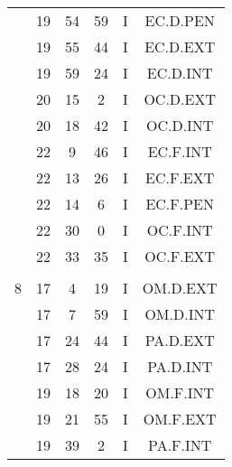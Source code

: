 \documentclass[12pt, a4paper]{article}
\begin{document}
\begin{multicols}{3}
{\begin{tabular}{c c c c c c}
	 	 	 	 & 19 & 54 & 59 & I & EC.D.PEN\\%
	 	 	 	 & 19 & 55 & 44 & I & EC.D.EXT\\%
	 	 	 	 & 19 & 59 & 24 & I & EC.D.INT\\%
	 	 	 	 & 20 & 15 & 2 & I & OC.D.EXT\\%
	 	 	 	 & 20 & 18 & 42 & I & OC.D.INT\\%
	 	 	 	 & 22 & 9 & 46 & I & EC.F.INT\\%
	 	 	 	 & 22 & 13 & 26 & I & EC.F.EXT\\%
	 	 	 	 & 22 & 14 & 6 & I & EC.F.PEN\\%
	 	 	 	 & 22 & 30 & 0 & I & OC.F.INT\\%
	 	 	 	 & 22 & 33 & 35 & I & OC.F.EXT\\%
	 	 	 	 & & & & & \\%
	 	 	 	8 & 17 & 4 & 19 & I & OM.D.EXT\\%
	 	 	 	 & 17 & 7 & 59 & I & OM.D.INT\\%
	 	 	 	 & 17 & 24 & 44 & I & PA.D.EXT\\%
	 	 	 	 & 17 & 28 & 24 & I & PA.D.INT\\%
	 	 	 	 & 19 & 18 & 20 & I & OM.F.INT\\%
	 	 	 	 & 19 & 21 & 55 & I & OM.F.EXT\\%
	 	 	 	 & 19 & 39 & 2 & I & PA.F.INT\\%
	 	 \end{tabular}
 	}
\end{multicols}
\end{document}
